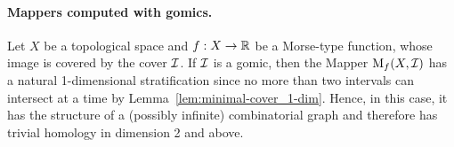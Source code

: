 \paragraph*{Mappers computed with gomics.} 
Let $X$ be a topological space and $f:X\rightarrow\mathbb{R}$ be a Morse-type function, whose image is covered by the cover $\mathcal{I}$. 
If $\mathcal{I}$ is a gomic, then the Mapper $\mathrm{M}_f(X,\mathcal{I})$ has a
natural 1-dimensional stratification since no more than two intervals
can intersect at a time by Lemma~\ref{lem:minimal-cover_1-dim}. Hence,
in this case, it has the structure of a (possibly infinite) combinatorial graph
and therefore has trivial homology in dimension 2 and above.





















